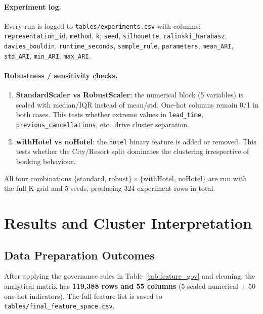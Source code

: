 \documentclass[12pt,a4paper]{article}
\begin{document}
\paragraph{Experiment log.}
Every run is logged to \texttt{tables/experiments.csv} with columns:
\texttt{representation\_id}, \texttt{method}, \texttt{k}, \texttt{seed},
\texttt{silhouette}, \texttt{calinski\_harabasz}, \texttt{davies\_bouldin},
\texttt{runtime\_seconds}, \texttt{sample\_rule}, \texttt{parameters},
\texttt{mean\_ARI}, \texttt{std\_ARI}, \texttt{min\_ARI}, \texttt{max\_ARI}.

\paragraph{Robustness / sensitivity checks.}
\begin{enumerate}[noitemsep,label=\textbf{R\arabic*}.]
  \item \textbf{StandardScaler vs RobustScaler}: the numerical block
        (5 variables) is scaled with median/IQR instead of mean/std.
        One-hot columns remain 0/1 in both cases.
        This tests whether extreme values in \texttt{lead\_time},
        \texttt{previous\_cancellations}, etc.\ drive cluster separation.
  \item \textbf{withHotel vs noHotel}: the \texttt{hotel} binary feature
        is added or removed.
        This tests whether the City/Resort split dominates the clustering
        irrespective of booking behaviour.
\end{enumerate}
All four combinations $\{$standard, robust$\} \times \{$withHotel, noHotel$\}$
are run with the full K-grid and 5 seeds, producing 324 experiment rows
in total.


\section{Results and Cluster Interpretation}
\label{sec:results}

\subsection{Data Preparation Outcomes}

After applying the governance rules in Table~\ref{tab:feature_gov} and cleaning,
the analytical matrix has \textbf{119,388 rows and 55 columns}
(5 scaled numerical $+$ 50 one-hot indicators).
The full feature list is saved to \texttt{tables/final\_feature\_space.csv}.
\end{document}
